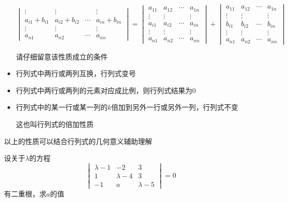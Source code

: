 \documentclass[12pt, a4paper, oneside, UTF8]{ctexbook}
\begin{document}
\begin{itemize}[leftmargin=4em]
\[\begin{vmatrix}
        \vdots & \vdots &  & \vdots\\
        a_{i1}+b_{i1} & a_{i2}+b_{i2} &\cdots & a_{in} + b_{in}\\
        \vdots & \vdots &  & \vdots\\
        a_{n1} & a_{n2} & \cdots & a_{nn}
    \end{vmatrix}=
    \begin{vmatrix}
        a_{11} & a_{12} & \cdots & a_{1n}\\
        \vdots & \vdots &  & \vdots\\
        a_{i1} & a_{i2} &\cdots & a_{in}\\
        \vdots & \vdots &  & \vdots\\
        a_{n1} & a_{n2} & \cdots & a_{nn}
    \end{vmatrix}+
    \begin{vmatrix}
        a_{11} & a_{12} & \cdots & a_{1n}\\
        \vdots & \vdots &  & \vdots\\
        b_{i1} & b_{i2} &\cdots & b_{in}\\
        \vdots & \vdots &  & \vdots\\
        a_{n1} & a_{n2} & \cdots & a_{nn}
    \end{vmatrix}
    \]
    \begin{rmk}
        请仔细留意该性质成立的条件
    \end{rmk}
    \item 行列式中两行或两列互换，行列式变号
    \item 行列式中两行或两列的元素对应成比例，则行列式结果为$0$
    \item 行列式中的某一行或某一列的$k$倍加到另外一行或另外一列，行列式不变
    \begin{rmk}
        这也叫行列式的倍加性质
    \end{rmk}
\end{itemize}
\begin{rmk}
    以上的性质可以结合行列式的几何意义辅助理解
\end{rmk}
\begin{example}
    设关于$\lambda$的方程
    \[
        \begin{vmatrix}
            \lambda-1&-2&3\\
            1&\lambda-4&3\\
            -1&a&\lambda-5
        \end{vmatrix}=0
    \]
    有二重根，求$a$的值
\end{example}
\end{document}

